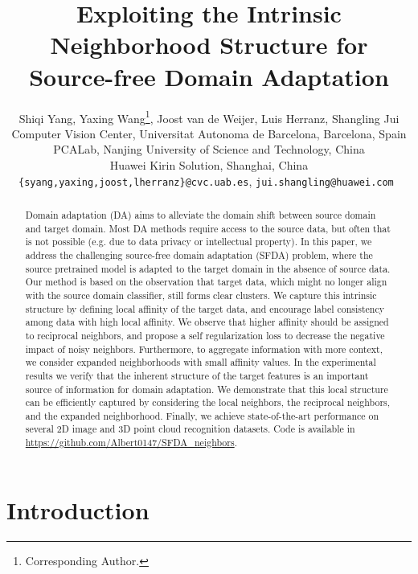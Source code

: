 \documentclass{article}
\title{Exploiting the Intrinsic Neighborhood Structure for Source-free Domain Adaptation}
\author{Shiqi Yang, Yaxing Wang\thanks{Corresponding Author.}, Joost van de Weijer, Luis Herranz, Shangling Jui\\
 Computer Vision Center, Universitat Autonoma de Barcelona, Barcelona, Spain\\
 PCALab, Nanjing University of Science and Technology, China\\
 Huawei Kirin Solution, Shanghai, China\\
{\tt\small \{syang,yaxing,joost,lherranz\}@cvc.uab.es}, \tt\small{jui.shangling@huawei.com}
}
\begin{document}
\maketitle

\begin{abstract}
Domain adaptation (DA) aims to alleviate the domain shift between source domain and target domain. Most DA methods require access to the source data, but often that is not possible (e.g. due to data privacy or intellectual property). In this paper, we address the challenging source-free domain adaptation (SFDA) problem, where the source pretrained model is adapted to the target domain in the absence of source data. Our method is based on the observation that target data, which might no longer align with the source domain classifier, still forms clear clusters. We capture this intrinsic structure by defining local affinity of the target data, and encourage label consistency among data with high local affinity. We observe that higher affinity should be assigned to reciprocal neighbors, and propose a self regularization loss to decrease the negative impact of noisy neighbors. Furthermore, to aggregate information with more context, we consider expanded neighborhoods with small affinity values. In the experimental results we verify that the inherent structure of the target features is an important source of information for domain adaptation. We demonstrate that this local structure can be efficiently captured by considering the local neighbors, the reciprocal neighbors, and the expanded neighborhood. Finally, we achieve state-of-the-art performance on several 2D image and 3D point cloud recognition datasets. Code is available in \url{https://github.com/Albert0147/SFDA_neighbors}.

\end{abstract}



\section{Introduction}\label{sec:intro}
\end{document}
